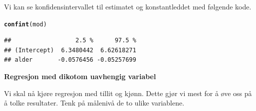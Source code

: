 \documentclass{article}\usepackage[]{graphicx}\usepackage[]{color}
\makeatletter
\newcommand{\hlstd}[1]{\textcolor[rgb]{0.345,0.345,0.345}{#1}}%
\newcommand{\hlkwd}[1]{\textcolor[rgb]{0.737,0.353,0.396}{\textbf{#1}}}%
\newenvironment{kframe}{%
 \def\at@end@of@kframe{}%
 \ifinner\ifhmode%
  \def\at@end@of@kframe{\end{minipage}}%
  \begin{minipage}{\columnwidth}%
 \fi\fi%
 \def\FrameCommand##1{\hskip\@totalleftmargin \hskip-\fboxsep
 \colorbox{shadecolor}{##1}\hskip-\fboxsep
     \hskip-\linewidth \hskip-\@totalleftmargin \hskip\columnwidth}%
 \MakeFramed {\advance\hsize-\width
   \@totalleftmargin\z@ \linewidth\hsize
   \@setminipage}}%
 {\par\unskip\endMakeFramed%
 \at@end@of@kframe}
\newenvironment{knitrout}{}{} %
\makeatother
\begin{document}
\hfill \break Vi kan se konfidensintervallet til estimatet og konstantleddet med følgende kode. 

\begin{knitrout}
\color{fgcolor}\begin{kframe}
\begin{alltt}
\hlkwd{confint}\hlstd{(mod)}
\end{alltt}
\begin{verbatim}
##                  2.5 %      97.5 %
## (Intercept)  6.3480442  6.62618271
## alder       -0.0576456 -0.05257699
\end{verbatim}
\end{kframe}
\end{knitrout}


\hfill \break \textbf{Regresjon med dikotom uavhengig variabel}

\hfill \break Vi skal nå kjøre regresjon med tillit og kjønn. Dette gjør vi mest for å øve oss på å tolke resultater. Tenk på målenivå de to ulike variablene. 
\end{document}

